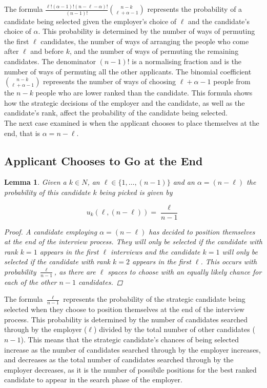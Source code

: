 \documentclass{article}
\newtheorem{lemma}{Lemma}
\begin{document}
The formula $\frac{\ell!(\alpha - 1)!(n-\ell-\alpha)!}{(n-1)!} \binom{n-k}{\ell+\alpha - 1}$ represents the probability of a candidate being selected given the employer's choice of $\ell$ and the candidate's choice of $\alpha$. This probability is determined by the number of ways of permuting the first $\ell$ candidates, the number of ways of arranging the people who come after $\ell$ and before $k$, and the number of ways of permuting the remaining candidates. The denominator $(n-1)!$ is a normalising fraction and is the number of ways of permuting all the other applicants. The binomial coefficient $\binom{n-k}{\ell+\alpha - 1}$ represents the number of ways of choosing $\ell+\alpha - 1$ people from the $n-k$ people who are lower ranked than the candidate. This formula shows how the strategic decisions of the employer and the candidate, as well as the candidate's rank, affect the probability of the candidate being selected.
\\[2ex]
The next case examined is when the applicant chooses to place themselves at the end, that is $\alpha = n-\ell $.

\subsection{Applicant Chooses to Go at the End}

\begin{lemma}\label{lemma:probability_alpha_n-l}
Given a $k\in N$, an $\ell \in \{1,\ldots,(n-1)\} $ and an  $\alpha = (n-\ell)$ the probability of this candidate $k$ being picked is given by

$$
    u_k(\ell,(n-\ell)) = \frac{\ell}{n-1}
$$

\begin{proof}
A candidate employing $\alpha = (n-\ell)$ has decided to position themselves at the end of the interview process. They will only be selected if the candidate with rank $k=1$ appears in the first $\ell$ interviews and the candidate $k=1$ will only be selected if the candidate with rank $k=2$ appears in the first $\ell$. This occurs with probability $\frac{\ell}{n-1}$, as there are $\ell$ spaces to choose with an equally likely chance for each of the other $n-1$ candidates.
\end{proof}
\end{lemma}

The formula $\frac{\ell}{n-1}$ represents the probability of the strategic candidate being selected when they choose to position themselves at the end of the interview process. This probability is determined by the number of candidates searched through by the employer ($\ell$) divided by the total number of other candidates ($n-1$). This means that the strategic candidate's chances of being selected increase as the number of candidates searched through by the employer increases, and decreases as the total number of candidates searched through by the employer decreases, as it is the number of possibile positions for the best ranked candidate to appear in the search phase of the employer.
\end{document}
